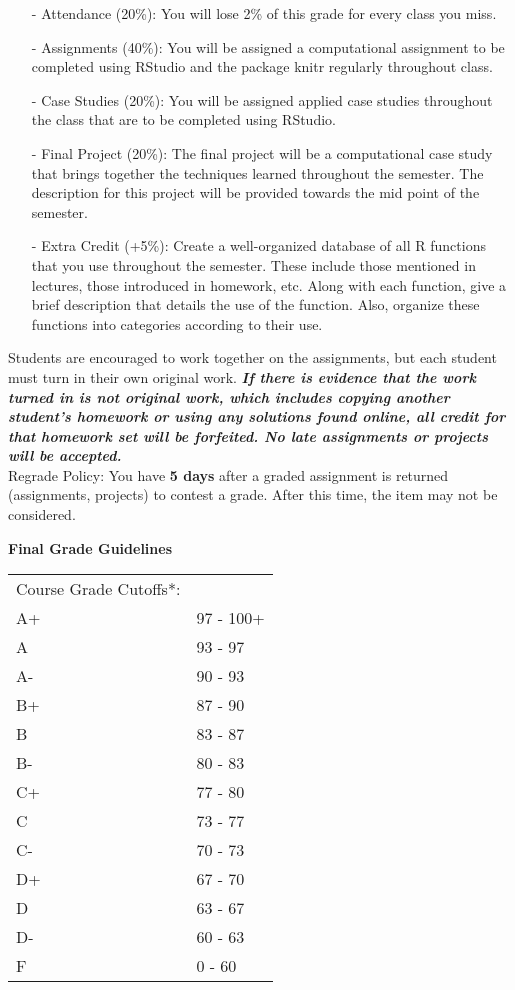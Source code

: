 \documentclass[10pt, oneside]{article}
\begin{document}
\begin{itemize}
	\item[-] Attendance (20\%): You will lose 2\% of this grade for every class you miss.
	\item[-] Assignments (40\%): You will be assigned a computational assignment to be completed using RStudio and the package knitr regularly throughout class.
	\item[-] Case Studies (20\%): You will be assigned applied case studies throughout the class that are to be completed using RStudio.
	\item[-] Final Project (20\%): The final project will be a computational case study that brings together the techniques learned throughout the semester. The description for this project will be provided towards the mid point of the semester.
	\item[-] Extra Credit (+5\%): Create a well-organized database of all R functions that you use throughout the semester. These include those mentioned in lectures, those introduced in homework, etc. Along with each function, give a brief description that details the use of the function. Also, organize these functions into categories according to their use.
\end{itemize}

Students are encouraged to work together on the assignments, but each student must turn in their own original work.\textit{ \textbf{ If there is evidence that the work turned in is not original work, which includes copying another student's homework or using any solutions found online, all credit for that homework set will be forfeited. No late assignments or projects will be accepted.}}\\

Regrade Policy: You have \textbf{5 days} after a graded assignment is returned (assignments, projects) to contest a grade.  After this time, the item may not be considered. 

\newpage
\thispagestyle{empty}


\noindent \textbf{Final Grade Guidelines}
\begin{table}[ht]
	\small
	\begin{tabular}{ll}
		Course Grade Cutoffs*: & \\
		A+	&97 - 100+ \\
		A	  &93 - 97 \\
		A-	&90 - 93 \\
		B+	&87 - 90 \\
		B	  &83 - 87 \\
		B-	&80 - 83 \\
		C+	&77 - 80 \\
		C	  &73 - 77 \\
		C-	&70 - 73 \\
		D+	&67 - 70 \\
		D	  &63 - 67 \\
		D-	&60 - 63 \\
		F	  &0 - 60 \\ 
	\end{tabular}
\end{table}
\end{document}
